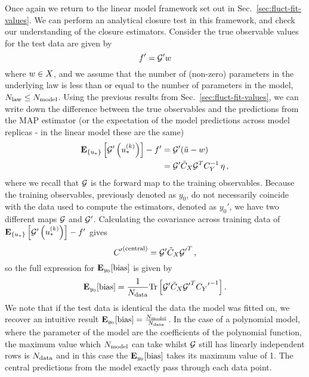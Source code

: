 Once again we return to the linear model framework set out in
Sec.~\ref{sec:fluct-fit-values}. We can perform an analytical closure test in
this framework, and check our understanding of the closure estimators. Consider
the true observable values for the test data are given by
\begin{equation}
    \label{eq:LinearLawMap}
    {{f}^{\prime}} = {{\mathcal{G}}^{\prime}} w
\end{equation}
where $w \in X$, and we assume that the number of (non-zero)
parameters in the underlying law is less than or equal to the number of
parameters in the model, $N_{\rm law} \leq N_{\rm model}$. Using the previous results from
Sec.~\ref{sec:fluct-fit-values}, we can write down the difference between the
true observables and the predictions from the MAP estimator (or the expectation
of the model predictions across model replicas - in the linear model these are
the same)
\begin{equation}
    \begin{split}
        \mathbf{E}_{\{ u_* \}} \left[ {{\mathcal{G}}^{\prime}}\left(u_*^{(k)}\right) \right] - {{f}^{\prime}} &=
        {{\mathcal{G}}^{\prime}} (\tilde{u} - w ) \\
        &= {{\mathcal{G}}^{\prime}} \tilde{C}_X \mathcal{G}^T C_{Y}^{-1} \, \eta \, ,
    \end{split}
\end{equation}
where we recall that $\mathcal{G}$ is the forward map to the training observables.
Because the training observables, previously denoted as $y_0$, do not necessarily coincide 
with the data used to compute the estimators, denoted as $y_0'$,
we have two different maps $\mathcal{G}$ and $\mathcal{G}'$. Calculating
the covariance across training data of
$\mathbf{E}_{\{ u_* \}} \left[ {{\mathcal{G}}^{\prime}}\left(u_*^{(k)}\right) \right] - {{f}^{\prime}}$ gives
\begin{equation}
    {{C}^{\prime}}^{(\rm central)} = {{\mathcal{G}}^{\prime}} \tilde{C}_X {{\mathcal{G}}^{\prime}}^T \, ,
\end{equation}
so the full expression for $\mathbf{E}_{y_0}[{\rm bias}]$ is given by
\begin{equation}\label{eq:BiasLinearModel}
    \mathbf{E}_{y_0}[{\rm bias}] = \frac{1}{N_{\rm data}}
    {\rm Tr} \left[
        {{\mathcal{G}}^{\prime}} \tilde{C}_X {{\mathcal{G}}^{\prime}}^T
        {{C_{Y}}^{\prime}}^{-1}
    \right].
\end{equation}
We note that if the test data is identical the data the model was fitted on, we
recover an intuitive result $\mathbf{E}_{y_0}[{\rm bias}] =
\frac{N_{\rm model}}{N_{\rm data}}$. In the case of a polynomial model, where the parameter
of the model are the coefficients of the polynomial function, the maximum value
which $N_{\rm model}$ can take whilst $\mathcal{G}$ still has linearly independent rows is
$N_{\rm data}$ and in this case the $\mathbf{E}_{y_0}[{\rm bias}]$ takes its
maximum value of 1. The central predictions from the model exactly pass through
each data point.


